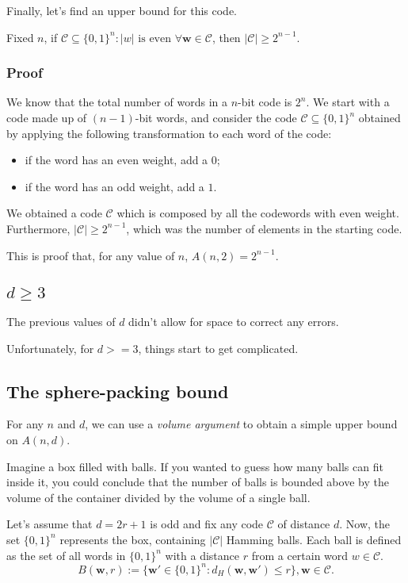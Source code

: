Finally, let's find an upper bound for this code.
\begin{lemma}
    Fixed $n$, if $ \mathcal{C} \subseteq \{0,1\}^n : |w| \text{ is even } \forall \mathbf{w}\in \mathcal{C}$, then $|\mathcal{C}| \geq 2^{n-1}$.%
\end{lemma}
\subsubsection*{Proof}
We know that the total number of words in a $n$-bit code is $2^n$. We start with a code made up of $(n-1)$-bit words, and consider the code $\mathcal{C} \subseteq \{0,1\}^n$ obtained by applying the following transformation to each word of the code:
\begin{itemize}
    \item if the word has an even weight, add a $0$;
    \item if the word has an odd weight, add a $1$.
\end{itemize}

We obtained a code $\mathcal{C}$ which is composed by all the codewords with even weight. Furthermore, $|\mathcal{C}| \geq 2^{n-1}$, which was the number of elements in the starting code. %

This is proof that, for any value of $n$, $A(n,2) = 2^{n-1}$.

\subsection*{$d\geq 3$}
The previous values of $d$ didn't allow for space to correct any errors.

Unfortunately, for $d >= 3$, things start to get complicated.

\subsection{The sphere-packing bound}

For any $n$ and $d$, we can use a \emph{volume argument} to obtain a simple upper bound on $A(n, d)$.

Imagine a box filled with balls. If you wanted to guess how many balls can fit inside it, you could conclude that the number of balls is bounded above by the volume of the container divided by the volume of a single ball.

Let's assume that $d = 2r+1$ is odd and fix any code $\mathcal{C}$ of distance $d$. Now, the set $\{0,1\}^n$ represents the box, containing $|\mathcal{C}|$ Hamming balls. Each ball is defined as the set of all words in $\{0,1\}^n$ with a distance $r$ from a certain word $w \in \mathcal{C}$.
\begin{equation}
    B(\mathbf{w}, r) := \{\mathbf{w}' \in \{0,1\}^n : d_H(\mathbf{w}, \mathbf{w}') \leq r\}, \mathbf{w} \in \mathcal{C}.
\end{equation}

